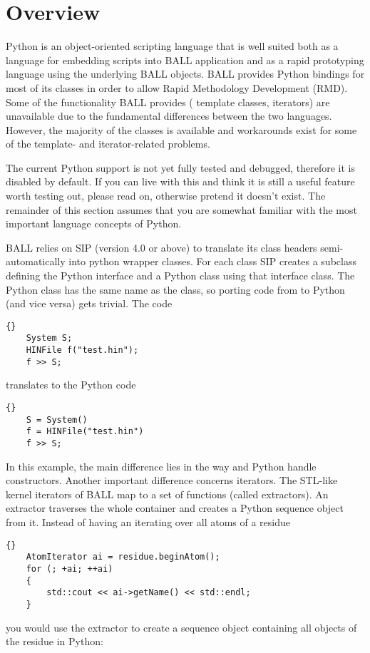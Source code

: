 \section{Overview}
Python is an object-oriented scripting language\cite{Python} that is well
suited both as a language for embedding scripts into BALL application and as a
rapid prototyping language using the underlying BALL objects.
BALL provides Python bindings for most of its classes in order to allow Rapid
Methodology Development (RMD). Some of the functionality BALL provides (\eg
template classes, iterators) are unavailable due to the fundamental differences 
between the two languages. However, the majority of the classes is available and
workarounds exist for some of the template- and iterator-related problems.

The current Python support is not yet fully tested and debugged, therefore it
is disabled by default. If you can live with
this and think it is still a useful feature worth testing out, please read on,
otherwise pretend it doesn't exist. The remainder of this section assumes that
you are somewhat familiar with the most important language concepts of Python.

BALL relies on SIP \cite{SIP} (version 4.0 or above) to translate its class
headers semi-automatically into python wrapper classes. For each \CPP class
SIP creates a subclass defining the Python interface and a Python class
using that \CPP interface class. The Python class has the same name as the
\CPP class, so porting code from \CPP to Python (and vice versa) gets trivial.
The \CPP code 

\begin{lstlisting}{}
	System S;
	HINFile f("test.hin");
	f >> S;
\end{lstlisting}

\noindent
translates to the Python code

\begin{lstlisting}{}
	S = System()
	f = HINFile("test.hin")
	f >> S;
\end{lstlisting}

\noindent
In this example, the main difference lies in the way \CPP and Python handle
constructors. Another important difference concerns iterators. The STL-like
kernel iterators of BALL map to a set of functions (called extractors). An
extractor traverses the whole container and creates a Python sequence object
from it. Instead of having an  iterating over all atoms of
a residue

\begin{lstlisting}{}
	AtomIterator ai = residue.beginAtom();
	for (; +ai; ++ai)
	{
		std::cout << ai->getName() << std::endl;
	}
\end{lstlisting}
\noindent you would use the  extractor to create a sequence
object containing all objects of the residue in Python:

